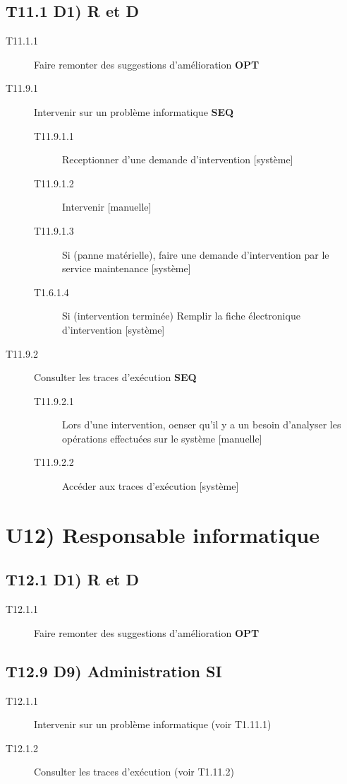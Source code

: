 	\subsection{T11.1 D1) R et D}
	\begin{description}
	\item[T11.1.1] Faire remonter des suggestions d'amélioration \textbf{OPT}
	\end{description}
	
	
	\begin{description}
	\item[T11.9.1] Intervenir sur un problème informatique \textbf{SEQ}
		\begin{description}
		\item[T11.9.1.1] Receptionner d'une demande d'intervention [système]
		\item[T11.9.1.2] Intervenir [manuelle]
		\item[T11.9.1.3] Si (panne matérielle), faire une demande d'intervention par
		le service maintenance [système]
		\item[T1.6.1.4] Si (intervention terminée) Remplir la fiche électronique
		d'intervention [système]
		\end{description}
	\item[T11.9.2] Consulter les traces d'exécution \textbf{SEQ}
		\begin{description}
		\item[T11.9.2.1] Lors d'une intervention, oenser qu'il y a un besoin
		d'analyser les opérations effectuées sur le système [manuelle]
		\item[T11.9.2.2] Accéder aux traces d'exécution [système]
		\end{description}
	\end{description} 
	
\section{U12) Responsable informatique}
	\subsection{T12.1 D1) R et D}
	\begin{description}
	\item[T12.1.1] Faire remonter des suggestions d'amélioration \textbf{OPT}
	\end{description}
	
	\subsection{T12.9 D9) Administration SI}
	\begin{description}
	\item[T12.1.1] Intervenir sur un problème informatique (voir T1.11.1)
	\item[T12.1.2] Consulter les traces d'exécution (voir T1.11.2)
	\end{description}

